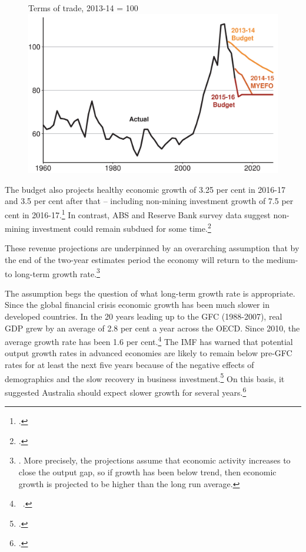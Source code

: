 \begin{figure}
%
{Terms of trade, 2013-14 = 100}
\includegraphics[width=\columnwidth]{Fiscal-challenges/figure/Figure7-1.pdf}
\end{figure}

The budget also projects healthy economic growth of 3.25 per cent in 2016-17 and 3.5 per cent after that – including non-mining investment growth of 7.5 per cent in 2016-17.\footcites[][1--7]{Treasury2015BudgetPapers201516}  In contrast, ABS and Reserve Bank survey data suggest non-mining investment could remain subdued for some time.\footcite[][38--44]{RBA2015a}  

These revenue projections are underpinned by an overarching assumption that by the end of the two-year estimates period the economy will return to the medium- to long-term growth rate.\footnote{\textcite{Treasury2014h}.  More precisely, the projections assume that economic activity increases to close the output gap, so if growth has been below trend, then economic growth is projected to be higher than the long run average.}

The assumption begs the question of what long-term growth rate is appropriate. Since the global financial crisis economic growth has been much slower in developed countries. In the 20 years leading up to the GFC (1988-2007), real GDP grew by an average of 2.8 per cent a year across the OECD\@. Since 2010, the average growth rate has been 1.6 per cent.\footnote{\gao\ \textcite{OECD2015a}.}  The IMF has warned that potential output growth rates in advanced economies are likely to remain below pre-GFC rates for at least the next five years because of the negative effects of demographics and the slow recovery in business investment.\footcite[][Chapter~3]{IMF2015b}  On this basis, it suggested Australia should expect slower growth for several years.\footcite{IMF2015} 

